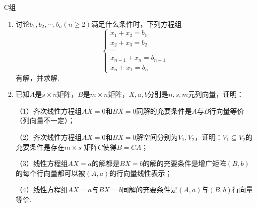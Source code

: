 \centerline{\heiti C组}
\begin{enumerate}
	\item 讨论$b_1,b_2,\cdots,b_n(n\ge 2)$满足什么条件时，下列方程组$$\begin{cases}
		x_1+x_2=b_1 \\ x_2+x_3=b_2 \\ \cdots \\ x_{n-1}+x_n=b_{n-1} \\ x_n+x_1=b_n
	\end{cases}$$有解，并求解.
	\item 已知$A$是$s \times n$矩阵，$B$是$m \times n$矩阵，$X,a,b$分别是$n,s,m$元列向量，证明：
	
	（1）齐次线性方程组$AX=0$和$BX=0$同解的充要条件是$A$与$B$行向量等价（列向量不一定）；

	（2）齐次线性方程组$AX=0$和$BX=0$解空间分别为$V_1,V_2$，证明：$V_1 \subseteq V_2$的充要条件是存在$m \times s$
	矩阵$C$使得$B=CA$；

	（3）线性方程组$AX=a$的解都是$BX=b$的解的充要条件是增广矩阵$(B,b)$的每个行向量都可以被$(A,a)$的行向量线性表示；

	（4）线性方程组$AX=a$与$BX=b$同解的充要条件是$(A,a)$与$(B,b)$行向量等价.
\end{enumerate}
